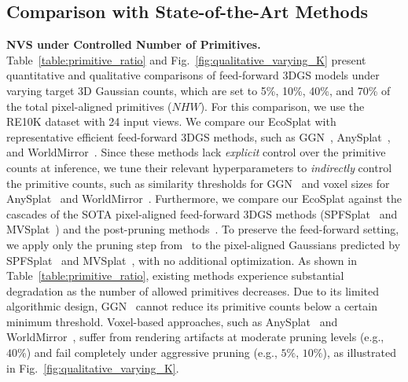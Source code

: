 


\subsection{Comparison with State-of-the-Art Methods}
\noindent \textbf{NVS under Controlled Number of Primitives.}
Table~\ref{table:primitive_ratio} and Fig.~\ref{fig:qualitative_varying_K} present quantitative and qualitative comparisons of feed-forward 3DGS models under varying target 3D Gaussian counts, which are set to 5\%, 10\%, 40\%, and 70\% of the total pixel-aligned primitives ($NHW$). For this comparison, we use the RE10K dataset with 24 input views.
We compare our EcoSplat with representative efficient feed-forward 3DGS methods, such as GGN~\cite{zhang2024gaussian}, AnySplat~\cite{jiang2025anysplat}, and WorldMirror~\cite{liu2025worldmirror}. Since these methods lack \textit{explicit} control over the primitive counts at inference, we tune their relevant hyperparameters to \textit{indirectly} control the primitive counts, such as similarity thresholds for GGN~\cite{zhang2024gaussian} and voxel sizes for AnySplat~\cite{jiang2025anysplat} and WorldMirror~\cite{liu2025worldmirror}.
Furthermore, we compare our EcoSplat against the cascades of the SOTA pixel-aligned feed-forward 3DGS methods (SPFSplat~\cite{huang2025no} and MVSplat~\cite{chen2024mvsplat}) and the post-pruning methods~\cite{fan2023lightgaussian, HansonTuPUP3DGS}.
To preserve the feed-forward setting, we apply only the pruning step from~\cite{fan2023lightgaussian,HansonTuPUP3DGS} to the pixel-aligned Gaussians predicted by SPFSplat~\cite{huang2025no} and MVSplat~\cite{chen2024mvsplat}, with no additional optimization. As shown in Table~\ref{table:primitive_ratio}, existing methods experience substantial degradation as the number of allowed primitives decreases. Due to its limited algorithmic design, GGN~\cite{zhang2024gaussian} cannot reduce its primitive counts below a certain minimum threshold. Voxel-based approaches, such as AnySplat~\cite{jiang2025anysplat} and WorldMirror~\cite{liu2025worldmirror}, suffer from rendering artifacts at moderate pruning levels (e.g., $40\%$) and fail completely under aggressive pruning (e.g., $5\%$, $10\%$), as illustrated in Fig.~\ref{fig:qualitative_varying_K}.
